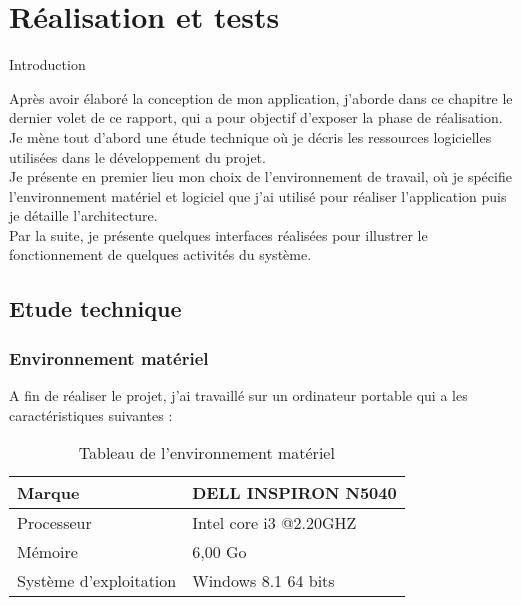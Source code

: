 \chapter{Réalisation et tests}


\thispagestyle{empty}

\newpage





\begin{Large}
Introduction 
\end{Large}

Après avoir élaboré la conception de mon application, j’aborde dans ce chapitre le dernier volet de ce rapport, qui a pour objectif d'exposer la phase de réalisation.\\
Je mène tout d’abord une étude technique où je décris les ressources logicielles utilisées dans le développement du projet.\\
 Je présente en premier lieu mon choix de l’environnement de travail, où je spécifie l’environnement matériel et logiciel que j’ai utilisé pour réaliser l’application puis je détaille l’architecture.\\
Par la suite, je présente quelques interfaces réalisées pour illustrer le fonctionnement de quelques activités du système. 

\section{Etude technique}

\subsection{Environnement matériel}
A fin de réaliser le projet, j’ai travaillé sur un ordinateur portable qui a les caractéristiques suivantes :\\ 

\begin{table}[!h]
\begin{center}
\begin{tabular}{|l|l|}
\hline 
Marque & DELL INSPIRON N5040 \\ 
\hline 
Processeur & Intel core i3 @2.20GHZ \\ 
\hline 
Mémoire & 6,00 Go \\ 
\hline 
Système d'exploitation & Windows 8.1 64 bits \\ 
\hline 
\end{tabular} 
\end{center}
\caption{Tableau de l'environnement matériel}
\end{table}

